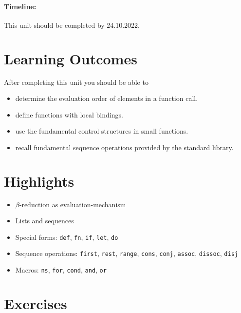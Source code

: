 \documentclass[11pt,a4paper]{article}
\begin{document}
\paragraph{Timeline:} This unit should be completed by 24.10.2022.

\section{Learning Outcomes}

After completing this unit you should be able to

\begin{itemize}
	\item determine the evaluation order of elements in a function call.
    \item define functions with local bindings.
    \item use the fundamental control structures in small functions.
    \item recall fundamental sequence operations provided by the standard library.
\end{itemize}

\section{Highlights}

\begin{itemize}
    \item $\beta$-reduction as evaluation-mechanism
    \item Lists and sequences
    \item Special forms: \verb|def|, \verb|fn|, \verb|if|, \verb|let|, \verb|do|
    \item Sequence operations: \verb|first|, \verb|rest|, \verb|range|, \verb|cons|, \verb|conj|, \verb|assoc|, \verb|dissoc|, \verb|disj|
    \item Macros: \verb|ns|, \verb|for|, \verb|cond|, \verb|and|, \verb|or|
\end{itemize}



\section{Exercises}
\end{document}
